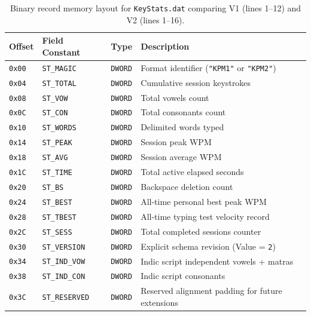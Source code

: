 \documentclass[11pt,a4paper]{article}
\begin{document}
\begin{table}[htbp]
\centering
\small
\begin{tabularx}{\textwidth}{lllX}
  \toprule
  \textbf{Offset} & \textbf{Field Constant} & \textbf{Type} & \textbf{Description} \\
  \midrule
  \texttt{0x00} & \texttt{ST\_MAGIC}   & \texttt{DWORD} & Format identifier (\texttt{"KPM1"} or \texttt{"KPM2"}) \\
  \texttt{0x04} & \texttt{ST\_TOTAL}   & \texttt{DWORD} & Cumulative session keystrokes \\
  \texttt{0x08} & \texttt{ST\_VOW}     & \texttt{DWORD} & Total vowels count \\
  \texttt{0x0C} & \texttt{ST\_CON}     & \texttt{DWORD} & Total consonants count \\
  \texttt{0x10} & \texttt{ST\_WORDS}   & \texttt{DWORD} & Delimited words typed \\
  \texttt{0x14} & \texttt{ST\_PEAK}    & \texttt{DWORD} & Session peak WPM \\
  \texttt{0x18} & \texttt{ST\_AVG}     & \texttt{DWORD} & Session average WPM \\
  \texttt{0x1C} & \texttt{ST\_TIME}    & \texttt{DWORD} & Total active elapsed seconds \\
  \texttt{0x20} & \texttt{ST\_BS}      & \texttt{DWORD} & Backspace deletion count \\
  \texttt{0x24} & \texttt{ST\_BEST}    & \texttt{DWORD} & All-time personal best peak WPM \\
  \texttt{0x28} & \texttt{ST\_TBEST}   & \texttt{DWORD} & All-time typing test velocity record \\
  \texttt{0x2C} & \texttt{ST\_SESS}    & \texttt{DWORD} & Total completed sessions counter \\
  \midrule
  \texttt{0x30} & \texttt{ST\_VERSION} & \texttt{DWORD} & Explicit schema revision (Value = \texttt{2}) \\
  \texttt{0x34} & \texttt{ST\_IND\_VOW}& \texttt{DWORD} & Indic script independent vowels + matras \\
  \texttt{0x38} & \texttt{ST\_IND\_CON}& \texttt{DWORD} & Indic script consonants \\
  \texttt{0x3C} & \texttt{ST\_RESERVED}& \texttt{DWORD} & Reserved alignment padding for future extensions \\
  \bottomrule
\end{tabularx}
\caption{Binary record memory layout for \texttt{KeyStats.dat} comparing V1 (lines 1–12) and V2 (lines 1–16).}
\label{tab:keystats}
\end{table}
\end{document}
